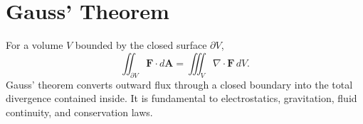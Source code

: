 \section{Gauss' Theorem}
\label{sec:gauss-theorem}
For a volume $V$ bounded by the closed surface $\partial V$,
\[
\iint_{\partial V}\mathbf F\cdot d\mathbf A
=\iiint_V \nabla\cdot\mathbf F\,dV.
\]
Gauss' theorem converts outward flux through a closed boundary into the total divergence contained inside. It is fundamental to electrostatics, gravitation, fluid continuity, and conservation laws.
